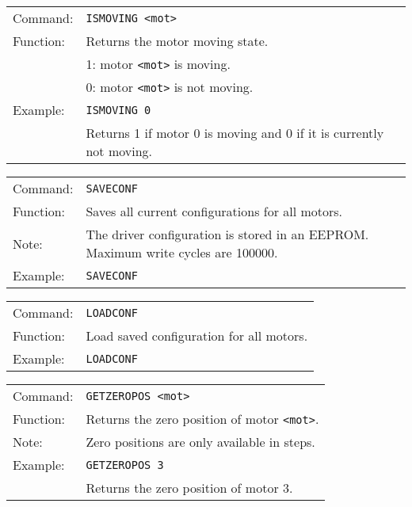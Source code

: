 \vspace{\vdistace}

\begin{table}[!htbp]
  \begin{tabularx}{\textwidth}{lX}
    Command:  & \texttt{ISMOVING <mot>}\\
    Function: & Returns the motor moving state.\\
              & 1: motor \texttt{<mot>} is moving.\\
		      & 0: motor \texttt{<mot>} is not moving.\\
    Example:  & \texttt{ISMOVING 0}\\
              & Returns 1 if motor 0 is moving and 0 if it is currently not moving.
  \end{tabularx}
\end{table}

\vspace{\vdistace}

\begin{table}[!htbp]
  \begin{tabularx}{\textwidth}{lX}
    Command:  & \texttt{SAVECONF}\\
    Function: & Saves all current configurations for all motors.\\
    Note:     & The driver configuration is stored in an EEPROM.
		            Maximum write cycles are 100000.\\
    Example:  & \texttt{SAVECONF}
  \end{tabularx}
\end{table}

\vspace{\vdistace}

\begin{table}[!htbp]
  \begin{tabularx}{\textwidth}{lX}
    Command:  & \texttt{LOADCONF}\\
    Function: & Load saved configuration for all motors.\\
    Example:  & \texttt{LOADCONF}
  \end{tabularx}
\end{table}

\vspace{\vdistace}

\begin{table}[!htbp]
  \begin{tabularx}{\textwidth}{lX}
    Command:  & \texttt{GETZEROPOS <mot>}\\
    Function: & Returns the zero position of motor \texttt{<mot>}.\\
    Note:     & Zero positions are only available in steps.\\
    Example:  & \texttt{GETZEROPOS 3}\\
              & Returns the zero position of motor 3.
  \end{tabularx}
\end{table}

